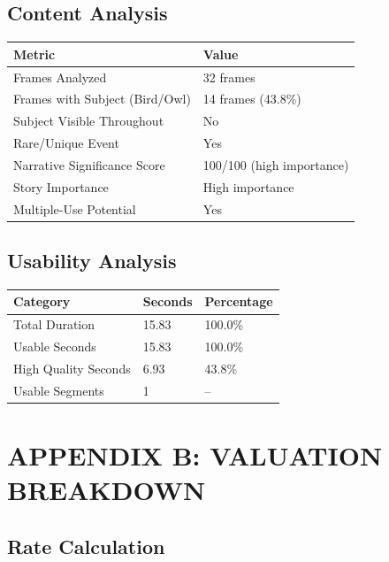 \documentclass[
  11pt,
]{article}
\begin{document}
\hypertarget{content-analysis}{%
\subsection{Content Analysis}\label{content-analysis}}

\begin{table}[h]
\centering
\begin{tabular}{L{4.5cm}L{9.5cm}}
\toprule
\textbf{Metric} & \textbf{Value} \\
\midrule
Frames Analyzed & 32 frames \\
Frames with Subject (Bird/Owl) & 14 frames (43.8\%) \\
Subject Visible Throughout & No \\
Rare/Unique Event & Yes \\
Narrative Significance Score & 100/100 (high importance) \\
Story Importance & High importance \\
Multiple-Use Potential & Yes \\
\bottomrule
\end{tabular}
\end{table}

\hypertarget{usability-analysis}{%
\subsection{Usability Analysis}\label{usability-analysis}}

\begin{table}[h]
\centering
\begin{tabular}{L{4.5cm}C{3cm}C{3cm}}
\toprule
\textbf{Category} & \textbf{Seconds} & \textbf{Percentage} \\
\midrule
Total Duration & 15.83 & 100.0\% \\
Usable Seconds & 15.83 & 100.0\% \\
High Quality Seconds & 6.93 & 43.8\% \\
Usable Segments & 1 & -- \\
\bottomrule
\end{tabular}
\end{table}

\hypertarget{appendix-b-valuation-breakdown}{%
\section{APPENDIX B: VALUATION
BREAKDOWN}\label{appendix-b-valuation-breakdown}}

\hypertarget{rate-calculation}{%
\subsection{Rate Calculation}\label{rate-calculation}}
\end{document}

